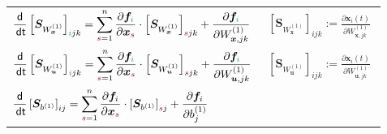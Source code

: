 \documentclass[a4paper, 12pt]{scrartcl}
\newcommand{\gruen}[2][cadGreen]{\textcolor{#1}{#2}}
\newcommand{\dunkelrot}[2][dunkelrot]{\textcolor{#1}{#2}}
\newcommand{\dt}{\thinspace \mathsf{dt}}
\begin{document}
\begin{center}
    \begin{tabular}{l r}
    $\begin{aligned}
        \frac{\mathsf{d}}{\dt} \left[\bm{S}_{W_{\bm{x}}^{(1)}}\right]_{\gruen{i}jk}
        =
        \sum_{\dunkelrot{s}=1}^{n}
        \frac{\partial \bm{f}_{\gruen{i}}}{\partial \bm{x}_{\dunkelrot{s}}}
        \cdot 
        \left[\bm{S}_{W_{\bm{x}}^{(1)}}\right]_{\dunkelrot{s}jk}
        +
        \frac{\partial \bm{f}_{\gruen{i}}}{\partial W^{(1)}_{\bm{x},jk}}
    \end{aligned}$
    &
    $\begin{aligned}
        \left[
            \bm{S}_{W_{\bm{x}}^{(1)}}
        \right]_{ijk} 
        := 
        \frac{\partial \bm{x}_i(t)}{\partial W^{(1)}_{\bm{x},jk}}
    \end{aligned}$
    \\
    $\begin{aligned}
        \frac{\mathsf{d}}{\dt} \left[\bm{S}_{W_{\bm{u}}^{(1)}}\right]_{\gruen{i}jk}
        =
        \sum_{\dunkelrot{s}=1}^{n}
        \frac{\partial \bm{f}_{\gruen{i}}}{\partial \bm{x}_{\dunkelrot{s}}}
        \cdot 
        \left[\bm{S}_{W_{\bm{u}}^{(1)}}\right]_{\dunkelrot{s}jk}
        +
        \frac{\partial \bm{f}_{\gruen{i}}}{\partial W^{(1)}_{\bm{u},jk}}
    \end{aligned}$
    &
    $\begin{aligned}
        \left[
            \bm{S}_{W_{\bm{u}}^{(1)}}
        \right]_{ijk} 
        := 
        \frac{\partial \bm{x}_i(t)}{\partial W^{(1)}_{\bm{u},jk}}
    \end{aligned}$
    \\
    $\begin{aligned}
        \frac{\mathsf{d}}{\dt} \left[\bm{S}_{b^{(1)}}\right]_{ij}
        =
        \sum_{\dunkelrot{s}=1}^{n}
        \frac{\partial \bm{f}_i}{\partial \bm{x}_{\dunkelrot{s}}}
        \cdot 
        \left[\bm{S}_{b^{(1)}}\right]_{\dunkelrot{s}j}
        +
        \frac{\partial \bm{f}_i}{\partial b^{(1)}_{j}}
    \end{aligned}$

\end{tabular}
\end{center}
\end{document}
